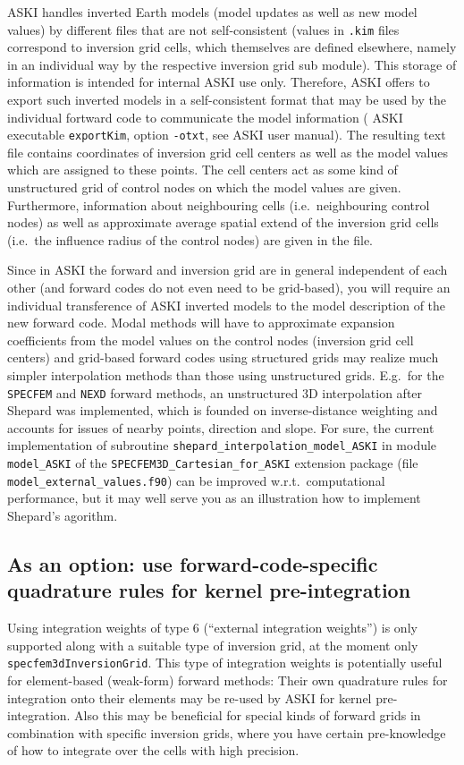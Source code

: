 \documentclass[12pt,a4paper]{article}
\newcommand{\lcode}[1]{\nolinkurl{#1}}
\newcommand{\ASKI}{ {\ttfamily ASKI} }
\begin{document}
\ASKI{} handles inverted Earth models (model updates as well as new model values) by different files that are
not self-consistent (values in \lcode{.kim} files correspond to inversion grid cells, which themselves are defined
elsewhere, namely in an individual way by the respective inversion grid sub module). This storage of information
is intended for internal \ASKI{} use only. Therefore, \ASKI{} offers to export such inverted models in a 
self-consistent format that may be used by the individual fortward code to communicate the model information
(\ASKI{} executable \lcode{exportKim}, option \lcode{-otxt}, see \ASKI{} user manual). The resulting text file
contains coordinates of inversion grid cell centers as well as the model values which are assigned to these points.
The cell centers act as some kind of unstructured grid of control nodes on which the model values are given.
Furthermore, information about neighbouring cells (i.e.\ neighbouring control nodes) as well as approximate average
spatial extend of the inversion grid cells (i.e.\ the influence radius of the control nodes) are given in the file.

Since in \ASKI{} the forward and inversion grid are in general independent of each other (and forward codes do not
even need to be grid-based), you will require an individual transference of \ASKI{} inverted models to the model 
description of the new forward code. Modal methods will have to approximate expansion coefficients from the model
values on the control nodes (inversion grid cell centers) and grid-based forward codes using structured grids may 
realize much simpler interpolation methods than those using unstructured grids. E.g.\ for the \lcode{SPECFEM} and
\lcode{NEXD} forward methods, an unstructured 3D interpolation after Shepard \cite{Shepard68} was implemented, 
which is founded on inverse-distance weighting and accounts for issues of nearby points, direction and slope. 
For sure, the current implementation of subroutine \lcode{shepard_interpolation_model_ASKI} in module 
\lcode{model_ASKI} of the \lcode{SPECFEM3D_Cartesian_for_ASKI} extension package (file \lcode{model_external_values.f90})
can be improved w.r.t.\ computational performance, but it may well serve you as an illustration how to implement
Shepard's agorithm. 

\subsection{As an option: use forward-code-specific quadrature rules for kernel pre-integration} \label{ssec-extend:external_intw}
Using integration weights of type 6 (``external integration weights'') is only supported along with a suitable 
type of inversion grid, at the moment only \lcode{specfem3dInversionGrid}. This type of integration weights
is potentially useful for element-based (weak-form) forward methods: Their own quadrature rules for integration onto 
their elements may be re-used by \ASKI{} for kernel pre-integration. Also this may be beneficial for special kinds of 
forward grids in combination with specific inversion grids, where you have certain pre-knowledge of how to 
integrate over the cells with high precision. 
\end{document}
